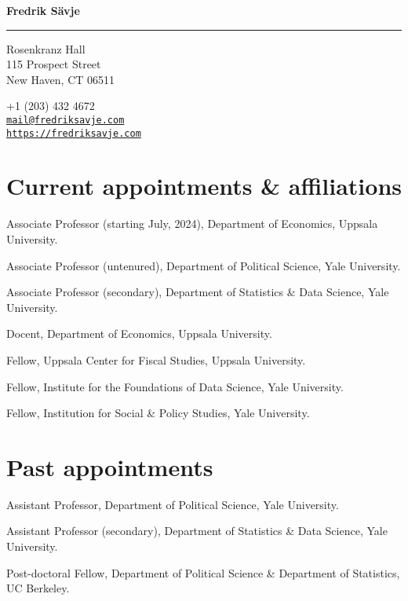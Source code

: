 \documentclass[10pt,letterpaper]{article}
\newenvironment{datelist}{
	\begin{list}{}{
		\setlength{\parskip}{0pt}
		\setlength{\itemsep}{4pt}
		\setlength{\parsep}{0.3em}
		\setlength{\leftmargin}{5.85em}
		\setlength{\labelwidth}{5.85em}
		\setlength{\labelsep}{1.5em}
		}
	}{
\end{list}
}
\newcommand{\dateitem}[2][]{\item[{#1}] {#2}}
\newenvironment{infolist}{
	\begin{list}{}{
		\setlength{\parskip}{0pt}
		\setlength{\itemsep}{4pt}
		\setlength{\parsep}{0.3em}
		\setlength{\leftmargin}{0em}
		\setlength{\labelwidth}{0em}
		}
	}{
\end{list}
}
\newcommand{\infoitem}[1]{\item {#1}}
\begin{document}
	{\huge \bf Fredrik Sävje}

	\rule{\textwidth}{1pt}

	\bigskip


	\begin{minipage}[t]{0.495\textwidth}
		Rosenkranz Hall \\
		115 Prospect Street \\
		New Haven, CT 06511
	\end{minipage}
	\begin{minipage}[t]{0.495\textwidth}
		+1 (203) 432 4672 \\
		\href{mailto:mail@fredriksavje.com}{\texttt{mail@fredriksavje.com}} \\
		\href{https://fredriksavje.com}{\texttt{https://fredriksavje.com}}
	\end{minipage}

	\vspace{0.3in}

	\section*{Current appointments \& affiliations}

	\begin{infolist}
		\infoitem{Associate Professor (starting July, 2024), Department of Economics, Uppsala University.}
		\infoitem{Associate Professor (untenured), Department of Political Science, Yale University.}
		\infoitem{Associate Professor (secondary), Department of Statistics \& Data Science, Yale University.}
		\infoitem{Docent, Department of Economics, Uppsala University.}
		\infoitem{Fellow, Uppsala Center for Fiscal Studies, Uppsala University.}
		\infoitem{Fellow, Institute for the Foundations of Data Science, Yale University.}
		\infoitem{Fellow, Institution for Social \& Policy Studies, Yale University.}
	\end{infolist}


	\section*{Past appointments}

	\begin{datelist}
		\dateitem[2017--2023]{Assistant Professor, Department of Political Science, Yale University.}
		\dateitem[2018--2023]{Assistant Professor (secondary), Department of Statistics \& Data Science, Yale University.}
		\dateitem[2015--2017]{Post-doctoral Fellow, Department of Political Science \& Department of Statistics, UC Berkeley.}
	\end{datelist}
\end{document}
